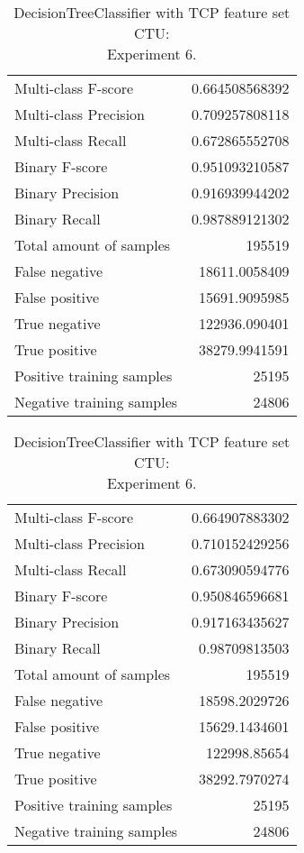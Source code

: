 \begin{table}[H]
\begin{minipage}{0.5\textwidth}
\caption{DecisionTreeClassifier with TCP feature set CTU: \\Experiment 5.}
\centering
\begin{tabular}{l r}
\toprule
Multi-class F-score & 0.664508568392 \\
Multi-class Precision & 0.709257808118 \\
Multi-class Recall & 0.672865552708 \\
\midrule
Binary F-score & 0.951093210587 \\
Binary Precision & 0.916939944202 \\
Binary Recall & 0.987889121302 \\
\midrule
Total amount of samples & 195519 \\
False negative & 18611.0058409 \\
False positive & 15691.9095985 \\
True negative & 122936.090401 \\
True positive & 38279.9941591 \\
\midrule
Positive training samples & 25195 \\
Negative training samples & 24806 \\
\bottomrule
\end{tabular}
\end{minipage}
\hfillx
\begin{minipage}{0.5\textwidth}
\caption{DecisionTreeClassifier with TCP feature set CTU: \\Experiment 6.}
\centering
\begin{tabular}{l r}
\toprule
Multi-class F-score & 0.664907883302 \\
Multi-class Precision & 0.710152429256 \\
Multi-class Recall & 0.673090594776 \\
\midrule
Binary F-score & 0.950846596681 \\
Binary Precision & 0.917163435627 \\
Binary Recall & 0.98709813503 \\
\midrule
Total amount of samples & 195519 \\
False negative & 18598.2029726 \\
False positive & 15629.1434601 \\
True negative & 122998.85654 \\
True positive & 38292.7970274 \\
\midrule
Positive training samples & 25195 \\
Negative training samples & 24806 \\
\bottomrule
\end{tabular}
\end{minipage}
\end{table}
